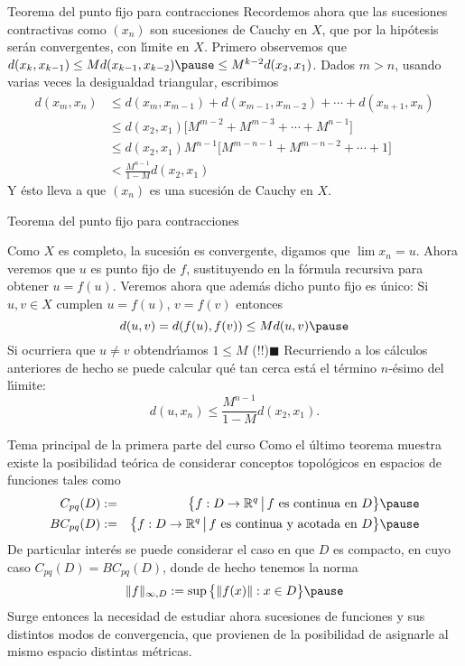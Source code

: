 \documentclass[xcolor=dvipsnames,10pt,handout, draft]{beamer}
\newcommand{\rzq}{\mathbb R^{q}}
\begin{document}
\begin{frame}{Teorema del punto fijo para contracciones}
Recordemos ahora que las sucesiones contractivas como $(x_n)$ son sucesiones de Cauchy en $X$, que por la hip\'otesis ser\'an convergentes, con l\'\i mite en $X$.  
\vskip6pt\pause
Primero observemos que $d(x_k,x_{k-1})\leq Md(x_{k-1},x_{k-2})\pause\leq M^{k-2}d(x_2,x_1)$.
\pause\vskip4pt
Dados $m>n$, usando varias veces la desigualdad triangular, escribimos
\begin{align*}
d(x_m,x_n)&\leq d(x_m,x_{m-1})+d(x_{m-1},x_{m-2})+\cdots+d(x_{n+1},x_{n})\\
&\leq d(x_2,x_1)\big[M^{m-2}+M^{m-3}+\cdots+M^{n-1}\big]\\
&\leq d(x_2,x_1)M^{n-1}\big[M^{m-n-1}+M^{m-n-2}+\cdots+1\big]\\
&<\frac{M^{n-1}}{1-M}d(x_2,x_1)
\end{align*}
\pause
Y \'esto lleva a que $(x_n)$ es una sucesi\'on de Cauchy en $X$.
\end{frame}


\begin{frame}{Teorema del punto fijo para contracciones}

Como $X$ es completo, la sucesi\'on es convergente, digamos que $\lim x_n=u$.
Ahora veremos que $u$ es punto fijo de $f$, sustituyendo en la f\'ormula recursiva para obtener $u=f(u)$.
\vskip4pt\pause
Veremos ahora que adem\'as dicho punto fijo es \'unico: \pause Si $u,v\in X$ cumplen $u=f(u)$, $v=f(v)$ entonces 
$$d(u,v)=d(f(u),f(v))\leq Md(u,v)\pause$$
Si ocurriera que $u\neq v$ obtendr\'\i amos $1\leq M$ (!!)\hfill$\blacksquare$
\vskip4pt\pause
Recurriendo a los c\'alculos anteriores de hecho se puede calcular qu\'e tan cerca est\'a el t\'ermino $n$-\'esimo del l\'\i imite: 
$$d(u,x_n)\leq\frac{M^{n-1}}{1-M}d(x_2,x_1).$$

\end{frame}


\begin{frame}{Tema principal de la primera parte del curso}
Como el \'ultimo teorema muestra existe la posibilidad te\'orica de considerar conceptos topol\'ogicos en espacios de funciones tales como
\begin{eqnarray*}
C_{pq}(D)&:=&\big\{f:D\to\rzq\,\big|\,f\text{ es continua en }D\big\}\pause\\
BC_{pq}(D)&:=&\big\{f:D\to\rzq\,\big|\,f\text{ es continua y acotada en }D\big\}\pause
\end{eqnarray*}
De particular inter\'es se puede considerar el caso en que $D$ es compacto, en cuyo caso $C_{pq}(D)=BC_{pq}(D)$, donde de hecho tenemos la norma
$$\|f\|_{\infty,D}:=\sup\big\{\|f(x)\|:x\in D\big\}\pause$$
\pause
Surge entonces la necesidad de estudiar ahora sucesiones de funciones y sus distintos modos de convergencia, que provienen de la posibilidad de asignarle al mismo espacio  distintas m\'etricas.
\end{frame}
\end{document}
